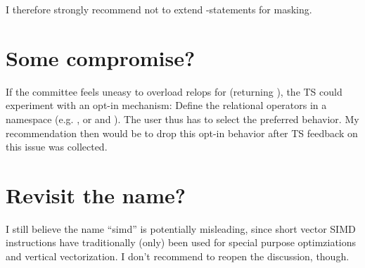 I therefore strongly recommend not to extend -statements for masking.

\section{Some compromise?}
If the committee feels uneasy to overload relops for \simd (returning \mask), the TS could experiment with an opt-in mechanism:
Define the relational operators in a namespace (e.g. , or  and ).
The user thus has to select the preferred behavior.
My recommendation then would be to drop this opt-in behavior after TS feedback on this issue was collected.

\section{Revisit the name?}
I still believe the name “simd” is potentially misleading, since short vector SIMD instructions have traditionally (only) been used for special purpose optimziations and vertical vectorization.
I don't recommend to reopen the discussion, though.


